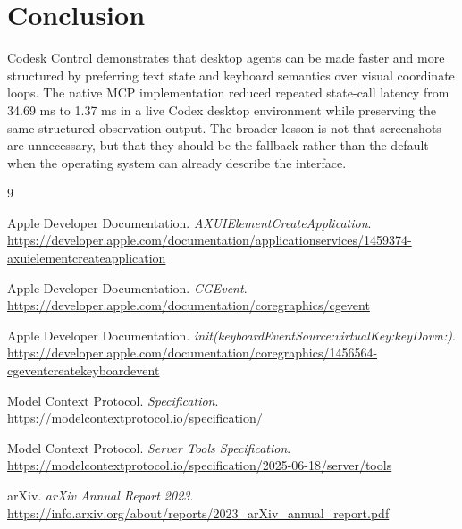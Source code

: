 \documentclass[11pt]{article}
\begin{document}
\section{Conclusion}

Codesk Control demonstrates that desktop agents can be made faster and more structured by preferring text state and keyboard semantics over visual coordinate loops. The native MCP implementation reduced repeated state-call latency from 34.69 ms to 1.37 ms in a live Codex desktop environment while preserving the same structured observation output. The broader lesson is not that screenshots are unnecessary, but that they should be the fallback rather than the default when the operating system can already describe the interface.

\begin{thebibliography}{9}

Apple Developer Documentation.
\newblock \textit{AXUIElementCreateApplication}.
\newblock \url{https://developer.apple.com/documentation/applicationservices/1459374-axuielementcreateapplication}

Apple Developer Documentation.
\newblock \textit{CGEvent}.
\newblock \url{https://developer.apple.com/documentation/coregraphics/cgevent}

Apple Developer Documentation.
\newblock \textit{init(keyboardEventSource:virtualKey:keyDown:)}.
\newblock \url{https://developer.apple.com/documentation/coregraphics/1456564-cgeventcreatekeyboardevent}

Model Context Protocol.
\newblock \textit{Specification}.
\newblock \url{https://modelcontextprotocol.io/specification/}

Model Context Protocol.
\newblock \textit{Server Tools Specification}.
\newblock \url{https://modelcontextprotocol.io/specification/2025-06-18/server/tools}

arXiv.
\newblock \textit{arXiv Annual Report 2023}.
\newblock \url{https://info.arxiv.org/about/reports/2023_arXiv_annual_report.pdf}

\end{thebibliography}
\end{document}
